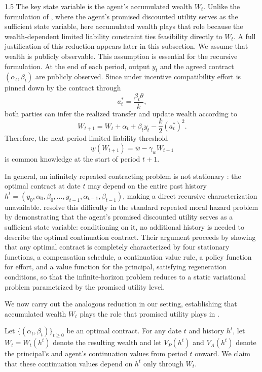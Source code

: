 \documentclass[12pt]{article}
\theoremstyle{definition}
\theoremstyle{plain}
\begin{document}
\begin{spacing}{1.5}
The key state variable is the agent's accumulated wealth $W_t$. Unlike the formulation of \textcite{spear1987}, where the agent's promised discounted utility serves as the sufficient state variable, here accumulated wealth plays that role because the wealth-dependent limited liability constraint ties feasibility directly to $W_t$. A full justification of this reduction appears later in this subsection. We assume that wealth is publicly observable. This assumption is essential for the recursive formulation. At the end of each period, output $y_t$ and the agreed contract $(\alpha_t,\beta_t)$ are publicly observed. Since under incentive compatibility effort is pinned down by the contract through
\[
a_t^*=\frac{\beta_t\theta}{k},
\]
both parties can infer the realized transfer and update wealth according to
\[
W_{t+1}=W_t+\alpha_t+\beta_t y_t-\frac{k}{2}(a_t^*)^2.
\]
Therefore, the next-period limited liability threshold
\[
\underline{w}(W_{t+1})=\overline w-\gamma_w W_{t+1}
\]
is common knowledge at the start of period $t+1$.

In general, an infinitely repeated contracting problem is not stationary \parencite[see][section~2]{spear1987}: the optimal contract at date $t$ may depend on the entire past history $h^t = (y_0, \alpha_0, \beta_0, \dots, y_{t-1}, \alpha_{t-1}, \beta_{t-1})$, making a direct recursive characterization unavailable. \textcite{spear1987} resolve this difficulty in the standard repeated moral hazard problem by demonstrating that the agent's promised discounted utility serves as a sufficient state variable: conditioning on it, no additional history is needed to describe the optimal continuation contract. Their argument proceeds by showing that any optimal contract is completely characterized by four stationary functions, a compensation schedule, a continuation value rule, a policy function for effort, and a value function for the principal, satisfying regeneration conditions, so that the infinite-horizon problem reduces to a static variational problem parametrized by the promised utility level.

We now carry out the analogous reduction in our setting, establishing that accumulated wealth $W_t$ plays the role that promised utility plays in \textcite{spear1987}.

Let $\{(\alpha_t, \beta_t)\}_{t \geq 0}$ be an optimal contract. For any date $t$ and history $h^t$, let $W_t = W_t(h^t)$ denote the resulting wealth and let $V_P(h^t)$ and $V_A(h^t)$ denote the principal's and agent's continuation values from period $t$ onward. We claim that these continuation values depend on $h^t$ only through $W_t$.


\end{spacing}
\end{document}
